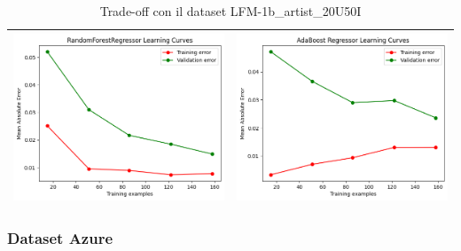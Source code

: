 \begin{table}[H]
\begin{tabularx}{\textwidth}{|X|X|}
        \includegraphics[width=\linewidth, trim=0 0 0 0]{images/RandomForestRegressor_lc2.png} &
        \includegraphics[width=\linewidth, trim=0 0 0 0]{images/AdaBoostRegressor_lc2.png} \\
        \hline
    \end{tabularx}
    \caption{Trade-off con il dataset LFM-1b\_artist\_20U50I}
    \label{tab:emissions_info}
\end{table}


\subsubsection{Dataset Azure}

